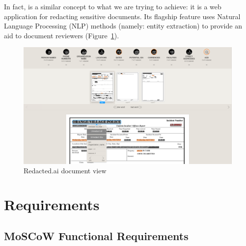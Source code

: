 \documentclass[\version]{l4proj}
\begin{document}
In fact, \textcite{RedactedAIRemovea} is a similar concept to what we are trying to achieve: it is a web application for redacting sensitive documents. Its flagship feature uses Natural Language Processing (NLP) methods (namely: entity extraction) to provide an aid to document reviewers (Figure~\ref{fig:redactedai}).

\begin{figure}[H]
    \centering
    \includegraphics[width=0.95\linewidth]{images/related_products/redactedai.png}
    \caption{Redacted.ai document view}\label{fig:redactedai}
\end{figure}

\chapter{Requirements}

\section{MoSCoW Functional Requirements}
\end{document}
